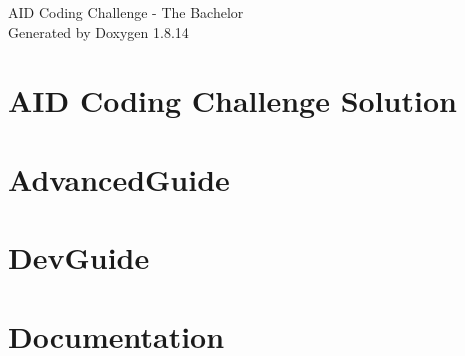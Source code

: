 \documentclass[twoside]{book}
\newcommand{\+}{\discretionary{\mbox{\scriptsize$\hookleftarrow$}}{}{}}
\newcommand{\clearemptydoublepage}{%
  \newpage{\pagestyle{empty}\cleardoublepage}%
}
\begin{document}
\hypersetup{pageanchor=false,
             bookmarksnumbered=true,
             pdfencoding=unicode
            }
\begin{titlepage}
\vspace*{7cm}
\begin{center}%
{\Large A\+ID Coding Challenge -\/ The Bachelor }\\
\vspace*{1cm}
{\large Generated by Doxygen 1.8.14}\\
\end{center}
\end{titlepage}
\clearemptydoublepage
{}
\tableofcontents
\clearemptydoublepage
{}
\hypersetup{pageanchor=true}

\chapter{A\+ID Coding Challenge Solution}
\label{index}\hypertarget{index}{}
\chapter{Advanced\+Guide}
\label{md___users_fjp_git_bachelor_bachelor-master_updated_vfinal_googletest-1_88_80_googletest_docs__advanced_guide}

\chapter{Dev\+Guide}
\label{md___users_fjp_git_bachelor_bachelor-master_updated_vfinal_googletest-1_88_80_googletest_docs__dev_guide}

\chapter{Documentation}
\label{md___users_fjp_git_bachelor_bachelor-master_updated_vfinal_googletest-1_88_80_googletest_docs__documentation}

\end{document}

